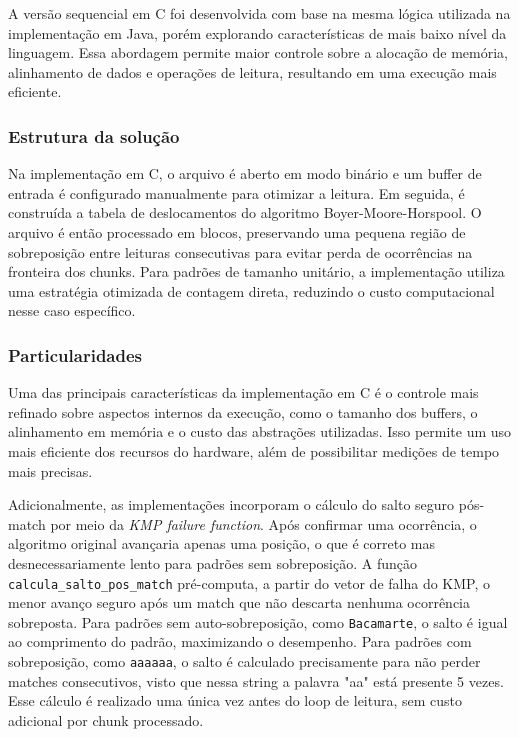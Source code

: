 \documentclass[10pt,twocolumn,a4paper]{article}
\begin{document}
A versão sequencial em C foi desenvolvida com base na mesma lógica utilizada na implementação em Java, porém explorando características de mais baixo nível da linguagem. Essa abordagem permite maior controle sobre a alocação de memória, alinhamento de dados e operações de leitura, resultando em uma execução mais eficiente.

\subsubsection{Estrutura da solução}

Na implementação em C, o arquivo é aberto em modo binário e um buffer de entrada é configurado manualmente para otimizar a leitura. Em seguida, é construída a tabela de deslocamentos do algoritmo Boyer-Moore-Horspool. O arquivo é então processado em blocos, preservando uma pequena região de sobreposição entre leituras consecutivas para evitar perda de ocorrências na fronteira dos chunks. Para padrões de tamanho unitário, a implementação utiliza uma estratégia otimizada de contagem direta, reduzindo o custo computacional nesse caso específico.

\subsubsection{Particularidades}

Uma das principais características da implementação em C é o controle mais refinado sobre aspectos internos da execução, como o tamanho dos buffers, o alinhamento em memória e o custo das abstrações utilizadas. Isso permite um uso mais eficiente dos recursos do hardware, além de possibilitar medições de tempo mais precisas.

Adicionalmente, as implementações incorporam o cálculo do salto seguro pós-match por meio da \textit{KMP failure function}. Após confirmar uma ocorrência, o algoritmo original avançaria apenas uma posição, o que é correto mas desnecessariamente lento para padrões sem sobreposição. A função \texttt{calcula\_salto\_pos\_match} pré-computa, a partir do vetor de falha do KMP, o menor avanço seguro após um match que não descarta nenhuma ocorrência sobreposta. Para padrões sem auto-sobreposição, como \texttt{Bacamarte}, o salto é igual ao
comprimento do padrão, maximizando o desempenho. Para padrões com
sobreposição, como \texttt{aaaaaa}, o salto é calculado precisamente para
não perder matches consecutivos, visto que nessa string a palavra "aa" está presente 5 vezes. Esse cálculo é realizado uma única
vez antes do loop de leitura, sem custo adicional por chunk processado.
\end{document}

